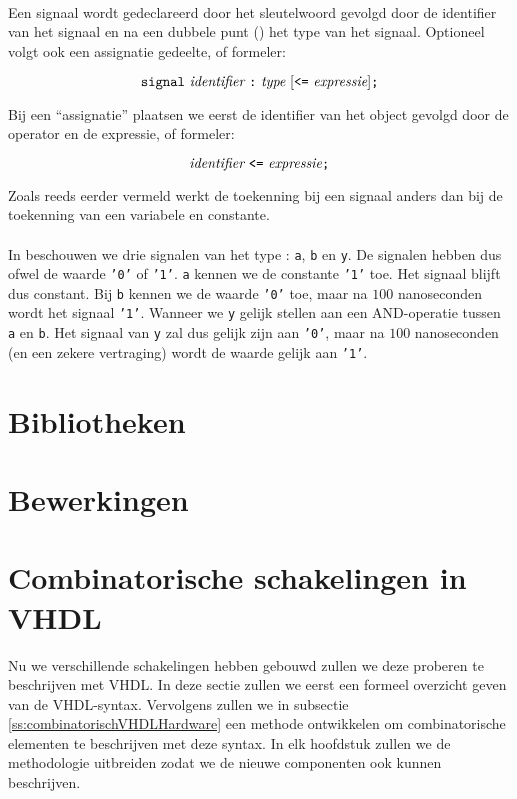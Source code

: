 \paragraph{}
Een signaal wordt gedeclareerd door het sleutelwoord  gevolgd door de identifier van het signaal en na een dubbele punt (\vhdltermen{:}) het type van het signaal. Optioneel volgt ook een assignatie gedeelte, of formeler:

\begin{equation}%
\vhdltermen{signal}\ \textit{identifier}\ \vhdltermen{:}\ \textit{type}\ [\vhdltermen{<=}\ \textit{expressie}]\vhdltermen{;}
\end{equation}

Bij een ``assignatie'' plaatsen we eerst de identifier van het object gevolgd door de \vhdltermen{<=} operator en de expressie, of formeler:

\begin{equation}%
\textit{identifier}\ \vhdltermen{<=}\ \textit{expressie}\vhdltermen{;}
\end{equation}

Zoals reeds eerder vermeld werkt de toekenning bij een signaal anders dan bij de toekenning van een variabele en constante.

\paragraph{}
In  beschouwen we drie signalen van het type : \texttt{a}, \texttt{b} en \texttt{y}. De signalen hebben dus ofwel de waarde \texttt{'0'} of \texttt{'1'}. \texttt{a} kennen we de constante \texttt{'1'} toe. Het signaal blijft dus constant. Bij \texttt{b} kennen we de waarde \texttt{'0'} toe, maar na $100$ nanoseconden wordt het signaal \texttt{'1'}. Wanneer we \texttt{y} gelijk stellen aan een AND-operatie tussen \texttt{a} en \texttt{b}. Het signaal van \texttt{y} zal dus gelijk zijn aan \texttt{'0'}, maar na $100$ nanoseconden (en een zekere vertraging) wordt de waarde gelijk aan \texttt{'1'}.
\section{Bibliotheken}
\section{Bewerkingen}
\section{Combinatorische schakelingen in VHDL}
Nu we verschillende schakelingen hebben gebouwd zullen we deze proberen te beschrijven met VHDL. In deze sectie zullen we eerst een formeel overzicht geven van de VHDL-syntax. Vervolgens zullen we in subsectie \ref{ss:combinatorischVHDLHardware} een methode ontwikkelen om combinatorische elementen te beschrijven met deze syntax. In elk hoofdstuk zullen we de methodologie uitbreiden zodat we de nieuwe componenten ook kunnen beschrijven.
